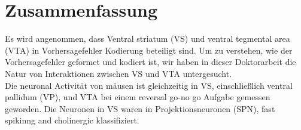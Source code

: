 \section*{Zusammenfassung}
Es wird angenommen, dass Ventral striatum (VS) und ventral tegmental area (VTA) in Vorhersagefehler Kodierung beteiligt sind. Um zu verstehen, wie der Vorhersagefehler geformet und kodiert ist, wir haben in dieser Doktorarbeit die Natur von Interaktionen zwischen VS und VTA untergesucht.\\Die neuronal Activität von mäusen ist gleichzeitig in VS, einschlie$ß$lich ventral pallidum (VP), und VTA bei einem reversal go-no go Aufgabe gemessen geworden. Die Neuronen in VS waren in Projektionsneuronen (SPN), {\color{red}fast spikinng and cholinergic} klassifiziert.